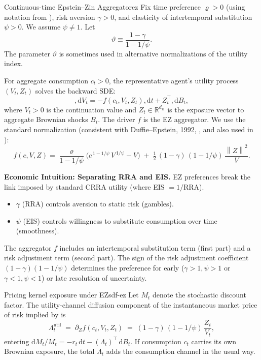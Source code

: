 ﻿\documentclass[11pt,letterpaper,oneside]{article}
\numberwithin{equation}{section}
\newcommand{\1}{\mathbf{1}}
\newcommand{\diff}{,\mathrm{d}}
\newcommand{\norm}[1]{\left\lVert #1\right\rVert}
\begin{document}
\begin{tcolorbox}[didacticstyle]
\begin{itemize}[leftmargin=1.1em,itemsep=0.25em]
\begin{definition}{Continuous-time Epstein--Zin Aggregator}{ez}
Fix time preference $\varrho>0$ (using notation from ), risk aversion $\gamma>0$, and elasticity of intertemporal substitution $\psi>0$. We assume $\psi\neq 1$. Let
\[
\vartheta \equiv \frac{1-\gamma}{1-1/\psi}.
\]
The parameter $\vartheta$ is sometimes used in alternative normalizations of the utility index.

For aggregate consumption $c_t>0$, the representative agent's utility process $(V_t, Z_t)$ solves the backward SDE:
\[
\diff V_t = -f(c_t, V_t, Z_t)\diff t + Z_t^\top \diff B_t,
\]
where $V_t>0$ is the continuation value and $Z_t\in\mathbb{R}^{d_B}$ is the exposure vector to aggregate Brownian shocks $B_t$. The driver $f$ is the EZ aggregator. We use the standard normalization (consistent with Duffie--Epstein, 1992, \cite{duffie_epstein_1992}, and also used in \cite{Sauzet2023}):
\begin{equation}\label{eq:ez-agg}
f(c,V,Z)
= \frac{\varrho}{1-1/\psi}\Big( c^{\,1-1/\psi}\,V^{\,1/\psi} - V \Big)
\; +\; \tfrac{1}{2}\,(1-\gamma)\,(1-1/\psi)\,\frac{\norm{Z}^2}{V}.
\end{equation}
\end{definition}

\begin{tcolorbox}[didacticstyle]
\textbf{Economic Intuition: Separating RRA and EIS.}
EZ preferences break the link imposed by standard CRRA utility (where EIS $= 1/\text{RRA}$).
\begin{itemize}[leftmargin=1.15em,itemsep=0.25em]
 \item $\gamma$ (RRA) controls aversion to static risk (gambles).
 \item $\psi$ (EIS) controls willingness to substitute consumption over time (smoothness).
\end{itemize}
The aggregator $f$ includes an intertemporal substitution term (first part) and a risk adjustment term (second part). The sign of the risk adjustment coefficient $(1-\gamma)(1-1/\psi)$ determines the preference for early ($\gamma>1, \psi>1$ or $\gamma<1, \psi<1$) or late resolution of uncertainty.
\end{tcolorbox}

\begin{proposition}{Pricing kernel exposure under EZ}{sdf-ez}
Let $M_t$ denote the stochastic discount factor. The utility-channel diffusion
component of the instantaneous market price of risk implied by
 is
\[
\Lambda^{\mathrm{util}}_t \;=\; \partial_Z f(c_t, V_t, Z_t) \;=\; (1-\gamma)\,(1-1/\psi)\,\frac{Z_t}{V_t},
\]
entering $\mathrm{d}M_t/M_t = -r_t\,\mathrm{d}t - (\Lambda_t)^{\!\top}\,\mathrm{d}B_t$.
If consumption $c_t$ carries its own Brownian exposure, the total $\Lambda_t$ adds
the consumption channel in the usual way.
\end{proposition}


\end{itemize}
\end{tcolorbox}
\end{document}

